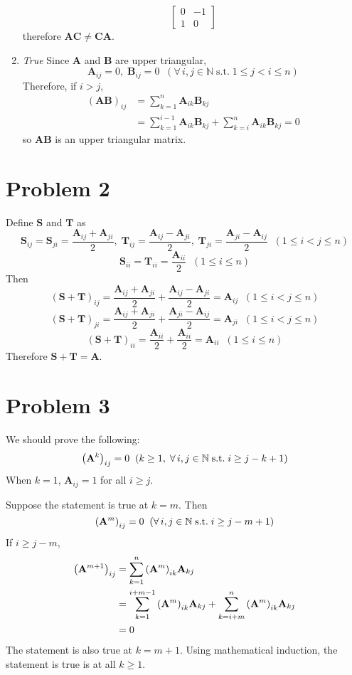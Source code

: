 \documentclass[10pt]{article}
\begin{document}
\begin{enumerate}[leftmargin=*, label={(\alph*)}]
$$\begin{bmatrix}
        0 & -1 \\ 1 & 0
    \end{bmatrix}$$
    therefore $\mathbf{AC} \neq \mathbf{CA}$.
    \item \textit{True } Since $\mathbf{A}$ and $\mathbf{B}$ are upper triangular, 
    $$\mathbf{A}_{ij} = 0, \; \mathbf{B}_{ij} = 0 \;\; (\forall \, i, j \in \mathbb{N} \; \mathrm{s.t.} \; 1 \leq j < i \leq n)$$
    Therefore, if $i > j$, 
    \begin{align*}
        (\mathbf{AB})_{ij} &= \sum_{k=1}^{n}\mathbf{A}_{ik}\mathbf{B}_{kj} \\
        &= \sum_{k=1}^{i-1}\mathbf{A}_{ik}\mathbf{B}_{kj} + \sum_{k=i}^{n}\mathbf{A}_{ik}\mathbf{B}_{kj} = 0
    \end{align*} 
    so $\mathbf{AB}$ is an upper triangular matrix.
\end{enumerate}

\section*{Problem 2}
Define $\mathbf{S}$ and $\mathbf{T}$ as
$$\mathbf{S}_{ij} = \mathbf{S}_{ji} = \frac{\mathbf{A}_{ij} + \mathbf{A}_{ji}}{2}, \; \mathbf{T}_{ij} = \frac{\mathbf{A}_{ij} - \mathbf{A}_{ji}}{2}, \; \mathbf{T}_{ji} = \frac{\mathbf{A}_{ji} - \mathbf{A}_{ij}}{2} \;\; (1 \leq i < j \leq n)$$
$$\mathbf{S}_{ii} = \mathbf{T}_{ii} = \frac{\mathbf{A}_{ii}}{2} \;\; (1 \leq i \leq n)$$
Then
$$(\mathbf{S+T})_{ij} = \frac{\mathbf{A}_{ij} + \mathbf{A}_{ji}}{2} + \frac{\mathbf{A}_{ij} - \mathbf{A}_{ji}}{2} = \mathbf{A}_{ij} \;\; (1 \leq i < j \leq n)$$
$$(\mathbf{S+T})_{ji} = \frac{\mathbf{A}_{ij} + \mathbf{A}_{ji}}{2} + \frac{\mathbf{A}_{ji} - \mathbf{A}_{ij}}{2} = \mathbf{A}_{ji} \;\; (1 \leq i < j \leq n)$$
$$(\mathbf{S+T})_{ii} = \frac{\mathbf{A}_{ii}}{2} + \frac{\mathbf{A}_{ii}}{2} = \mathbf{A}_{ii} \;\; (1 \leq i \leq n)$$
Therefore $\mathbf{S + T} = \mathbf{A}$.

\section*{Problem 3}
We should prove the following:
$$\qty(\mathbf{A}^k)_{ij} = 0 \;\; (k \geq 1, \; \forall \, i, j \in \mathbb{N} \; \mathrm{s.t.} \; i \geq j - k + 1)$$
When $k = 1$, $\mathbf{A}_{ij} = 1$ for all $i \geq j$.
\vspace{3mm}

Suppose the statement is true at $k = m$. Then
$$\qty(\mathbf{A}^m)_{ij} = 0 \;\; (\forall \, i, j \in \mathbb{N} \; \mathrm{s.t.} \; i \geq j - m + 1)$$
If $i \geq j - m$,
\begin{align*}
    \qty(\mathbf{A}^{m+1})_{ij} &= \sum_{k=1}^{n}\qty(\mathbf{A}^m)_{ik}\mathbf{A}_{kj} \\
    &= \sum_{k=1}^{i+m-1}\qty(\mathbf{A}^m)_{ik}\mathbf{A}_{kj} + \sum_{k=i+m}^{n}\qty(\mathbf{A}^m)_{ik}\mathbf{A}_{kj} \\
    &= 0
\end{align*}
The statement is also true at $k = m+1$.
Using mathematical induction, the statement is true is at all $k \geq 1$.
\vspace{3mm}
\end{document}

